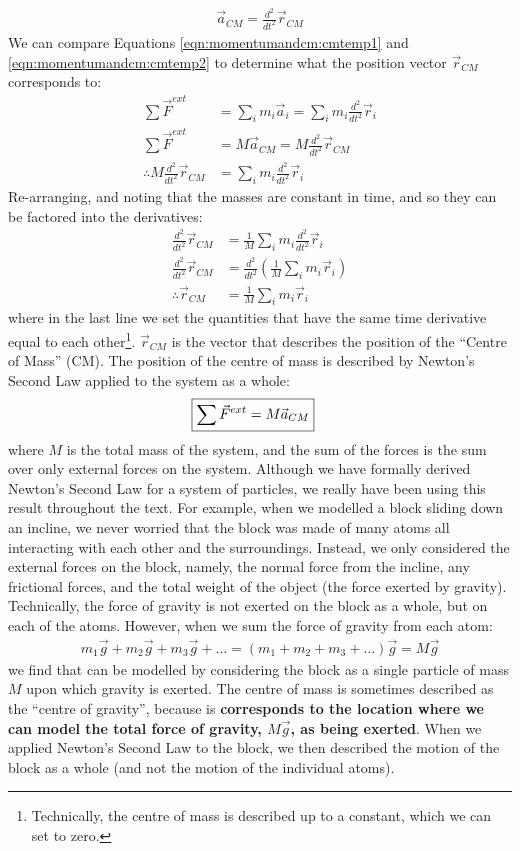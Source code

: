 \begin{align*}
\vec a_{CM} = \frac{d^2 }{dt^2}\vec r_{CM}
\end{align*}
We can compare Equations \ref{eqn:momentumandcm:cmtemp1} and \ref{eqn:momentumandcm:cmtemp2} to determine what the position vector $\vec r_{CM}$ corresponds to:
\begin{align*}
\sum \vec F^{ext}&= \sum_i m_i \vec a_i = \sum_i m_i \frac{d^2 }{dt^2}\vec r_i \\
\sum \vec F^{ext}&=M\vec a_{CM} = M \frac{d^2 }{dt^2}\vec r_{CM}\\
\therefore M \frac{d^2 }{dt^2}\vec r_{CM}&= \sum_i m_i \frac{d^2 }{dt^2}\vec r_i
\end{align*}
Re-arranging, and noting that the masses are constant in time, and so they can be factored into the derivatives:
\begin{align*}
\frac{d^2 }{dt^2}\vec r_{CM} &= \frac{1}{M}\sum_i m_i \frac{d^2 }{dt^2}\vec r_i\\
\frac{d^2 }{dt^2}\vec r_{CM} &= \frac{d^2 }{dt^2}\left(\frac{1}{M}\sum_i m_i\vec r_i \right)\\
\therefore \vec r_{CM} &=\frac{1}{M}\sum_i m_i\vec r_i
\end{align*}
where in the last line we set the quantities that have the same time derivative equal to each other\footnote{Technically, the centre of mass is described up to a constant, which we can set to zero.}. $\vec r_{CM}$ is the vector that describes the position of the ``Centre of Mass'' (CM). The position of the centre of mass is described by Newton's Second Law applied to the system as a whole:
\begin{align}
\Aboxed{\sum \vec F^{ext}&=M\vec a_{CM}}
\end{align}
where $M$ is the total mass of the system, and the sum of the forces is the sum over only external forces on the system. Although we have formally derived Newton's Second Law for a system of particles, we really have been using this result throughout the text. For example, when we modelled a block sliding down an incline, we never worried that the block was made of many atoms all interacting with each other and the surroundings. Instead, we only considered the external forces on the block, namely, the normal force from the incline, any frictional forces, and the total weight of the object (the force exerted by gravity). Technically, the force of gravity is not exerted on the block as a whole, but on each of the atoms. However, when we sum the force of gravity from each atom:
\begin{align*}
m_1\vec g+ m_2 \vec g + m_3\vec g + \dots = (m_1+m_2+m_3+\dots)\vec g = M\vec g
\end{align*}
we find that can be modelled by considering the block as a single particle of mass $M$ upon which gravity is exerted. The centre of mass is sometimes described as the ``centre of gravity'', because is \textbf{corresponds to the location where we can model the total force of gravity, $M\vec g$, as being exerted}. When we applied Newton's Second Law to the block, we then described the motion of the block as a whole (and not the motion of the individual atoms). 

